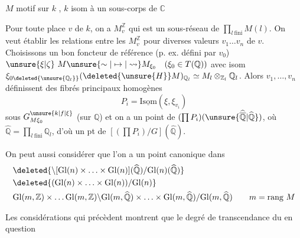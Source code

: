$M$ motif sur $k$ , $k$ isom à un sous-corps de $\mathbb C$

Pour toute place $v$ de $k$, on a $M_v^{\mathbb Z}$ qui est
un sous-réseau de $\prod_{l\ \mathrm{fini}}M(l)$. On veut établir
les relations entre les $M_v^{\mathbb Z}$ pour diverses
valeurs $v_1\ldots v_n$ de $v$. Choisissons un
bon foncteur de référence (p. ex. défini par $v_0$)
$\unsure{\xi|\zeta}\ M\unsure{\sim|\mapsto|\rightsquigarrow} M_{\xi_0}\quad(\xi_0\in T(\mathbb Q))$ avec  isom 
$\xi_{0\deleted{\unsure{\mathbb Q_l}}}(\deleted{\unsure{H}}M)_{\mathbb Q_l}\simeq M_l\otimes_{\mathbb Z_l}\mathbb Q_l$. Alors $v_1,\ldots,v_n$ définissent des
fibrés principaux homogènes
\[
P_i=\underline{\mathrm{Isom}}(\xi,\xi_{v_i})
\]
sous $G_{M\xi_0}^{\unsure{k|f|\xi}}$ (sur $\mathbb Q$) et on a un
point de $(\prod P_i)(\unsure{\widehat{\overline{\mathbb Q}}|\widehat{\mathbb Q}})$, où $\widehat{\mathbb Q}=\prod_{l\ \mathrm{fini}}\mathbb Q_l$,
d'où un pt de $[(\prod P_i)/G](\widehat{\mathbb Q})$.

On peut aussi considérer que l'on a un
point canonique dans 
\[
\begin{aligned}
&\deleted{\backslash[\mathrm{Gl}(n)\times\ldots\times\mathrm{Gl}(n)](\widehat{\mathbb Q})/\mathrm{Gl}(n)(\widehat{\mathbb Q})}\\
&\deleted{(\mathrm{Gl}(n)\times\ldots\times\mathrm{Gl}(n))/\mathrm{Gl}(n)}\\
&\mathrm{Gl}(m,\mathbb Z)\times\ldots\mathrm{Gl}(m,\mathbb Z)\backslash
\mathrm{Gl}(m,\widehat{\mathbb Q})\times\ldots\times\mathrm{Gl}(m,\widehat{\mathbb Q})/
\mathrm{Gl}(m,\widehat{\mathbb Q})\qquad m=\text{rang }M
\end{aligned}
\]

Les considérations qui précèdent montrent que
le degré de transcendance du  en question
